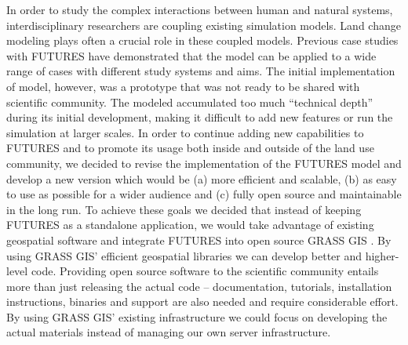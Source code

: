 \documentclass{isprs}
\begin{document}
In order to study the complex interactions between human and natural systems,
interdisciplinary researchers are coupling %
existing simulation models.
Land change modeling plays often a crucial role in these coupled models.
Previous case studies with FUTURES have demonstrated 
that the model can be applied to a wide range of cases with different study systems and aims.
%
The initial implementation of model, however, was a prototype that was not ready %
to be shared
with scientific community. 
%
The modeled accumulated too much ``technical depth'' \cite{easterbrook2014open} during its initial development, 
making it difficult to add new features or run the simulation at larger scales.
%
%
In order to continue adding new capabilities to FUTURES and to promote
its usage 
both inside and outside of 
the land use community,
we decided to revise the implementation of the FUTURES model 
and develop a new version which would be (a) more efficient and scalable, 
(b) as easy to use as possible for a wider audience and (c)
fully open source and maintainable in the long run.
To achieve these goals we 
decided that instead of keeping FUTURES as a standalone application,
we would take advantage of existing geospatial software and integrate FUTURES
into open source GRASS GIS \cite{Neteler08}.
By using GRASS GIS' efficient geospatial libraries
we can develop better and higher-level code.
%
Providing open source software to the scientific community entails more than just releasing the actual code -- 
documentation, tutorials, installation
instructions, binaries and support are also needed 
and require considerable effort. %
%
%
By using GRASS GIS' existing infrastructure we could focus on developing the actual materials
instead of managing our own server infrastructure.
\end{document}
